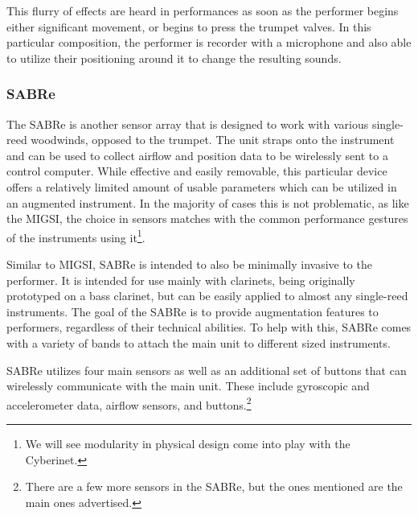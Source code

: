 This flurry of effects are heard in performances as soon as the performer begins either significant movement, or begins to press the trumpet valves. In this particular composition, the performer is recorder with a microphone and also able to utilize their positioning around it to change the resulting sounds.


\subsubsection{SABRe}

The SABRe is another sensor array that is designed to work with various single-reed woodwinds, opposed to the trumpet. The unit straps onto the instrument and can be used to collect airflow and position data to be wirelessly sent to a control computer. While effective and easily removable, this particular device offers a relatively limited amount of usable parameters which can be utilized in an augmented instrument. In the majority of cases this is not problematic, as like the MIGSI, the choice in sensors matches with the common performance gestures of the instruments using it\footnote{We will see modularity in physical design come into play with the Cyberinet.}. 

Similar to MIGSI, SABRe is intended to also be minimally invasive to the performer. It is intended for use mainly with clarinets, being originally prototyped on a bass clarinet, but can be easily applied to almost any single-reed instruments\cite{Schiesser2012}. The goal of the SABRe is to provide augmentation features to performers, regardless of their technical abilities\cite{Schiesser2012}. To help with this, SABRe comes with a variety of bands to attach the main unit to different sized instruments. 

SABRe utilizes four main sensors as well as an additional set of buttons that can wirelessly communicate with the main unit. These include gyroscopic and accelerometer data, airflow sensors, and buttons.\footnote{There are a few more sensors in the SABRe, but the ones mentioned are the main ones advertised.}

